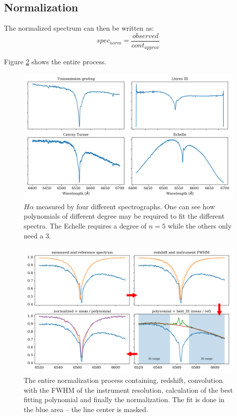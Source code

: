 \documentclass[10pt,a4paper,notitlepage,twocolumn]{article}
\begin{document}
\subsection{Normalization}
The normalized spectrum can then be written as:
\begin{equation}
	spec_{norm} = \frac{observed}{cont_{approx}}
\end{equation}

Figure \ref*{normalize_howto} shows the entire process.

\begin{figure}[h]
	\includegraphics[width=\columnwidth]{img/four_spectra_big.png}
	\caption{$H\alpha$ measured by four different spectrographs. One can see how polynomials of different degree may be required to fit the different spectra. The Echelle requires a degree of $n=5$ while the others only need a $3$.}
	\label{four_spectra}
\end{figure}

\begin{figure}[h]
	\includegraphics[width=\columnwidth]{img/normalize_howto.png}
	\caption{The entire normalization process containing, redshift, convolution with the FWHM of the instrument resolution, calculation of the best fitting polynomial and finally the normalization. The fit is done in the blue area -- the line center is masked.}
	\label{normalize_howto}
\end{figure}
\end{document}
